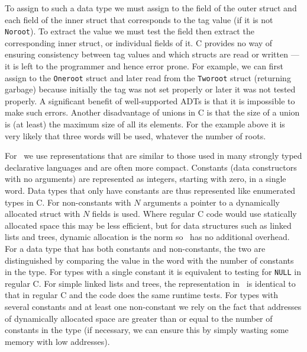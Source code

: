 To assign to such a data type we must assign to the \verb@tag@ field of
the outer struct and each field of the inner struct that corresponds
to the tag value (if it is not \texttt{Noroot}).  To extract the value
we must test the \verb@tag@ field then extract the corresponding inner
struct, or individual fields of it.  C provides no way of ensuring
consistency between tag values and which structs are read or written
--- it is left to the programmer and hence error prone.  For example,
we can first assign to the \texttt{Oneroot} struct and later read from
the \texttt{Tworoot} struct (returning garbage) because initially
the tag was not set properly or later it was not tested properly.
A significant benefit of well-supported ADTs is that it is impossible
to make such errors.
Another disadvantage of unions in C is that the size of a union is (at
least) the maximum size of all its elements.  For the example above it is
very likely that three words will be used, whatever the number of roots.

For \adtpp\ we use representations that are similar to those used in
many strongly typed declarative languages and are often more compact.
Constants (data constructors with no arguments) are represented as
integers, starting with zero, in a single word.  Data types
that only have constants are thus represented like enumerated types in C.
For non-constants with
$N$ arguments a pointer to a dynamically allocated struct with $N$
fields is used.  Where regular C code would use statically allocated
space this may be less efficient, but for data structures such as linked
lists and trees, dynamic allocation is the norm so \adtpp\ has
no additional overhead.  For a data type that has both constants and
non-constants, the two are distinguished by comparing the value in the
word with the number of constants in the type.  For types
with a single constant it is equivalent to
testing for \texttt{NULL} in regular C.  For simple linked lists
and trees, the representation in \adtpp\ is identical to that
in regular C and the code does the same runtime tests.  For types with
several constants and at least one non-constant we rely on the fact that
addresses of dynamically allocated space are greater than or
equal to the number of
constants in the type (if necessary,
we can ensure this by simply wasting some memory with low addresses).

